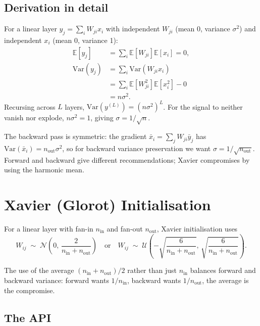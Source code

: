 \subsection{Derivation in detail}
\label{ssec:initialization:variance_derivation}

For a linear layer $y_j = \sum_i W_{ji} x_i$ with independent
$W_{ji}$ (mean 0, variance $\sigma^2$) and independent $x_i$
(mean 0, variance 1):
\begin{align*}
  \mathbb{E}[y_j] &= \sum_i \mathbb{E}[W_{ji}] \mathbb{E}[x_i] = 0, \\
  \mathrm{Var}(y_j) &= \sum_i \mathrm{Var}(W_{ji} x_i) \\
  &= \sum_i \mathbb{E}[W_{ji}^2] \mathbb{E}[x_i^2] - 0 \\
  &= n \sigma^2.
\end{align*}
Recursing across $L$ layers, $\mathrm{Var}(y^{(L)}) = (n \sigma^2)^L$.
For the signal to neither vanish nor explode, $n \sigma^2 = 1$,
giving $\sigma = 1/\sqrt{n}$.

The backward pass is symmetric: the gradient $\bar{x}_i = \sum_j W_{ji} \bar{y}_j$
has $\mathrm{Var}(\bar{x}_i) = n_{\text{out}} \sigma^2$, so for
backward variance preservation we want $\sigma = 1/\sqrt{n_{\text{out}}}$.
Forward and backward give different recommendations; Xavier
compromises by using the harmonic mean.

\section{Xavier (Glorot) Initialisation}
\label{sec:initialization:xavier}

For a linear layer with fan-in $n_{\text{in}}$ and fan-out
$n_{\text{out}}$, Xavier initialisation uses
\[
W_{ij} \;\sim\; \mathcal{N}\!\left(0,\, \frac{2}{n_{\text{in}} + n_{\text{out}}}\right)
\quad \text{or} \quad
W_{ij} \;\sim\; \mathcal{U}\!\left(-\sqrt{\frac{6}{n_{\text{in}} + n_{\text{out}}}},\, \sqrt{\frac{6}{n_{\text{in}} + n_{\text{out}}}}\right).
\]

The use of the average $(n_{\text{in}} + n_{\text{out}}) / 2$
rather than just $n_{\text{in}}$ balances forward and backward
variance: forward wants $1/n_{\text{in}}$, backward wants
$1/n_{\text{out}}$, the average is the compromise.

\subsection{The API}
\label{ssec:initialization:xavier_api}

